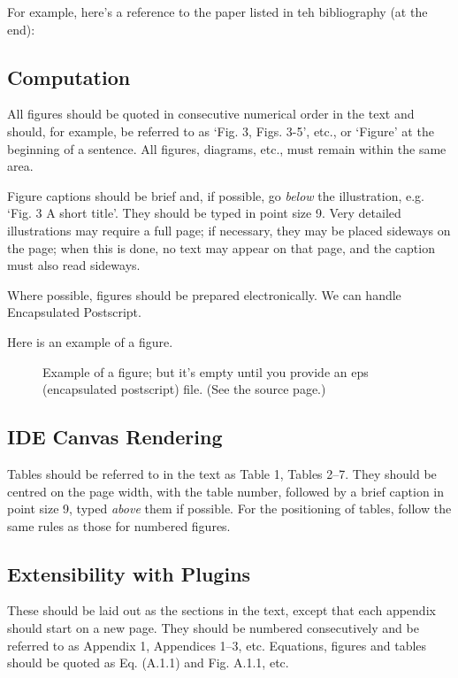 \documentclass[aps,prb,twocolumn,superscriptaddress,floatfix,longbibliography]{revtex4-2}
\begin{document}
For example, here's a reference to the paper
listed in teh bibliography (at the end):

\subsection{Computation}

All figures should be quoted in consecutive numerical order
in the text and should, for example, be referred to as
`Fig. 3, Figs. 3-5', etc., or `Figure' at the beginning of a
sentence.
All figures, diagrams, etc., must remain within the same area.

Figure captions should be brief and, if possible,
go {\it below} the illustration, e.g. `Fig. 3 A short title'.
They should be typed in point size 9. Very detailed illustrations may
require a full page; if necessary, they may be placed sideways on the
page; when this is done, no text may appear on that page, and the
caption must also read sideways. 

Where possible, figures should be prepared electronically.
We can handle Encapsulated Postscript.

Here is an example of a figure.

\begin{figure}
\label{fig:cc}
\caption{Example of a figure; but it's empty
until you provide an eps (encapsulated postscript)
file. (See the source page.)}
\begin{center}
\end{center}
\end{figure}

\subsection{IDE Canvas Rendering}

Tables should be referred to in the text as Table 1, Tables 2--7.
They should be centred on the page width, with the table
number, followed by a brief caption in point size 9, typed
{\it above} them if possible. For the
positioning of tables, follow the same rules as those for numbered figures.

\subsection{Extensibility with Plugins}

These should be laid out as the sections in the text,
except that each appendix should start on a new page.
They should be numbered consecutively and be referred
to as Appendix 1, Appendices 1--3, etc. 
Equations, figures and tables should be
quoted as Eq. (A.1.1) and Fig. A.1.1, etc.  
\end{document}

